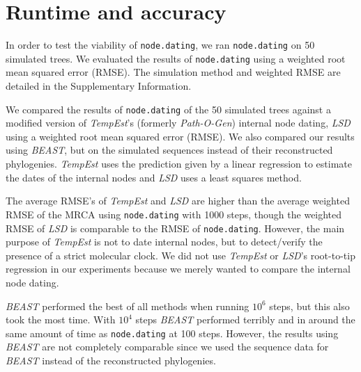 \documentclass{bioinfo}
\newcommand{\code}[1]{{\tt #1}}
\begin{document}
\section{Runtime and accuracy} \label{sec:tests}
In order to test the viability of \code{node.dating}, we ran \code{node.dating} on 50 simulated trees.
We evaluated the results of \code{node.dating} using a weighted root mean squared error (RMSE).
The simulation method and weighted RMSE are detailed in the Supplementary Information.

We compared the results of \code{node.dating} of the 50 simulated trees against a modified version of \emph{TempEst}'s (formerly \emph{Path-O-Gen}) internal node dating, \emph{LSD} using a weighted root mean squared error (RMSE).
We also compared our results using \emph{BEAST}, but on the simulated sequences instead of their reconstructed phylogenies.
\emph{TempEst} uses the prediction given by a linear regression to estimate the dates of the internal nodes and \emph{LSD} uses a least squares method.

The average RMSE's of \emph{TempEst} and \emph{LSD} are higher than the average weighted RMSE of the MRCA using \code{node.dating} with 1000 steps, though the weighted RMSE of \emph{LSD} is comparable to the RMSE of \code{node.dating}.
However, the main purpose of \emph{TempEst} is not to date internal nodes, but to detect/verify the presence of a strict molecular clock.
We did not use \emph{TempEst} or \emph{LSD}'s root-to-tip regression in our experiments because we merely wanted to compare the internal node dating.

\emph{BEAST} performed the best of all methods when running $10^6$ steps, but this also took the most time.
With $10^4$ steps \emph{BEAST} performed terribly and in around the same amount of time as \code{node.dating} at 100 steps.
However, the results using \emph{BEAST} are not completely comparable since we used the sequence data for \emph{BEAST} instead of the reconstructed phylogenies.
\end{document}
